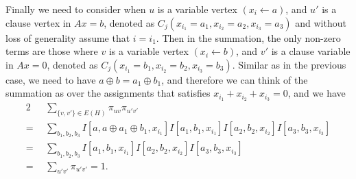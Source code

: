 \documentclass[a4paper,twoside,justified]{tufte-handout}
\begin{document}
\begin{description}
    Finally we need to consider when $u$ is a variable vertex $(x_i \leftarrow a)$,
    and $u'$ is a clause vertex in $Ax=b$, denoted as $C_j(x_{i_1}=a_1,x_{i_2}=a_2,x_{i_3}=a_3)$
    and without loss of generality assume that $i=i_1$.
    Then in the summation, the only non-zero terms are those where $v$ is a variable vertex $(x_i \leftarrow b)$,
    and $v'$ is a clause variable in $Ax=0$, denoted as $C_j(x_{i_1}=b_1,x_{i_2}=b_2,x_{i_3}=b_3)$.
    Similar as in the previous case, we need to have $a \oplus b=a_1 \oplus b_1$,
    and therefore we can think of the summation as over the assignments that satisfies $x_{i_1}+x_{i_2}+x_{i_3}=0$,
    and we have
    \begin{alignat*}{2}
      &~ \sum_{\{v,v'\} \in E(H)} \pi_{uv} \pi_{u'v'} \\
      = ~&~ \sum_{b_1,b_2,b_3} I[a,a \oplus a_1 \oplus b_1,x_{i_1}] I[a_1,b_1,x_{i_1}] I[a_2,b_2,x_{i_2}] I[a_3,b_3,x_{i_3}] \\
      = ~&~ \sum_{b_1,b_2,b_3} I[a_1,b_1,x_{i_1}] I[a_2,b_2,x_{i_2}] I[a_3,b_3,x_{i_3}] \\
      = ~&~ \sum_{u'v'} \pi_{u'v'} = 1.
    \end{alignat*}
\end{description}



\end{document}
